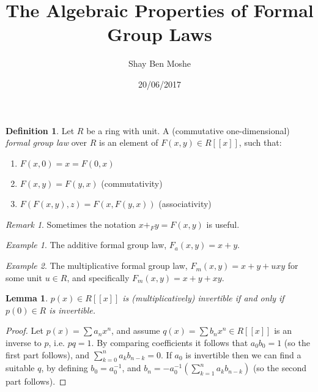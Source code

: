 \documentclass{article}
\title{The Algebraic Properties of Formal Group Laws}
\author{Shay Ben Moshe}
\date{20/06/2017}
\newtheorem*{lemma*}{Lemma}
\theoremstyle{definition}
\newtheorem*{definition*}{Definition}
\theoremstyle{remark}
\newtheorem*{remark*}{Remark}
\newtheorem*{example*}{Example}
\begin{document}
	\maketitle
	
	\begin{definition*}
		Let $R$ be a ring with unit.
		A (commutative one-dimensional) \emph{formal group law} over $R$ is an element of $F\left(x,y\right) \in R\left[\left[x\right]\right]$, such that:
		\begin{enumerate}
			\item $F\left(x,0\right) = x = F\left(0,x\right)$
			\item $F\left(x,y\right)=F\left(y,x\right)$ (commutativity)
			\item $F\left(F\left(x,y\right),z\right)=F\left(x,F\left(y,x\right)\right)$ (associativity)
		\end{enumerate}
	\end{definition*}

	\begin{remark*}
		Sometimes the notation $x +_F y = F\left(x,y\right)$ is useful.
	\end{remark*}

	\begin{example*}
		The additive formal group law, $F_a\left(x,y\right) = x+y$.
	\end{example*}

	\begin{example*}
		The multiplicative formal group law, $F_m\left(x,y\right) = x+y+uxy$ for some unit $u\in R$, and specifically $F_m\left(x,y\right) = x+y+xy$.
	\end{example*}

	\begin{lemma*}
		$p\left(x\right) \in R\left[\left[x\right]\right]$ is (multiplicatively) invertible if and only if $p\left(0\right) \in R$ is invertible.
	\end{lemma*}
	\begin{proof}
		Let $p\left(x\right) = \sum a_n x^n$, and assume $q\left(x\right) = \sum b_n x^n \in R\left[\left[x\right]\right]$ is an inverse to $p$, i.e. $pq = 1$. 
		By comparing coefficients it follows that $a_0 b_0 = 1$ (so the first part follows), and $\sum_{k=0}^n a_k b_{n-k} = 0$.
		If $a_0$ is invertible then we can find a suitable $q$, by defining $b_0 = a_0^{-1}$, and $b_n = - a_0^{-1} \left(\sum_{k=1}^n a_k b_{n-k}\right)$ (so the second part follows).
	\end{proof}
\end{document}
